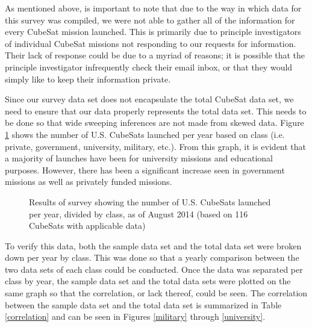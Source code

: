 \documentclass[11pt]{article}
\begin{document}
As mentioned above, is important to note that due to the way in which data for this survey was compiled, we were not able to gather all of the information for every CubeSat mission launched. This is primarily due to principle investigators of individual CubeSat missions not responding to our requests for information.  Their lack of response could be due to a myriad of reasons; it is possible that the principle investigator infrequently check their email inbox, or that they would simply like to keep their information private. 

Since our survey data set does not encapsulate the total CubeSat data set, we need to ensure that our data properly represents the total data set. This needs to be done so that wide sweeping inferences are not made from skewed data. Figure \ref{classperyear} shows the number of U.S. CubeSats launched per year based on class (i.e. private, government, university, military, etc.).  From this graph, it is evident that a majority of launches have been for university missions and educational purposes.  However, there has been a significant increase seen in government missions as well as privately funded missions.  

\begin{figure}[t!]
\centering
{}
\caption{Results of survey showing the number of U.S. CubeSats launched per year, divided by class, as of August 2014 (based on 116 CubeSats with applicable data)}
\label{classperyear}
\end{figure}

To verify this data, both the sample data set and the total data set were broken down per year by class. This was done so that a yearly comparison between the two data sets of each class could be conducted. Once the data was separated per class by year, the sample data set and the total data sets were plotted on the same graph so that the correlation, or lack thereof, could be seen. The correlation between the sample data set and the total data set is summarized in Table \ref{correlation} and can be seen in Figures \ref{military} through \ref{university}. 
\end{document}
